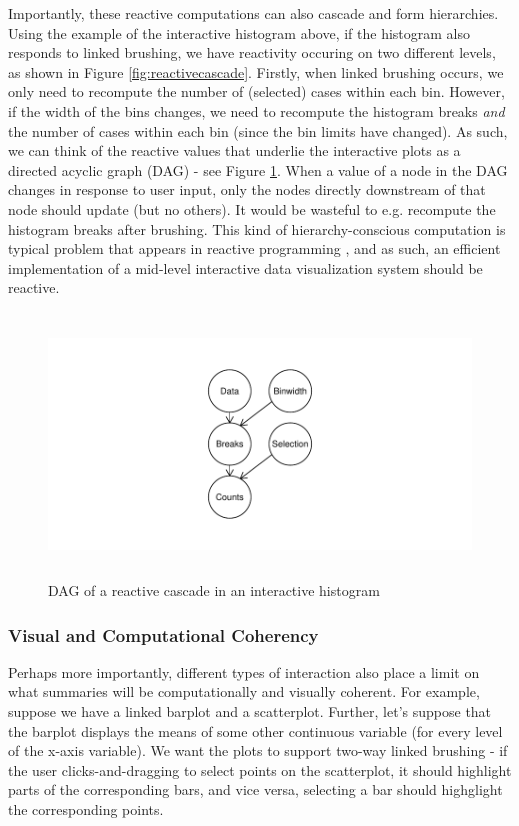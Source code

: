 \documentclass[12pt,a4paper]{article}
\begin{document}
Importantly, these reactive computations can also cascade and form hierarchies. Using the example of the interactive histogram above, if the histogram also responds to linked brushing, we have reactivity occuring on two different levels, as shown in Figure \ref{fig:reactivecascade}. Firstly, when linked brushing occurs, we only need to recompute the number of (selected) cases within each bin. However, if the width of the bins changes, we need to recompute the histogram breaks \textit{and} the number of cases within each bin (since the bin limits have changed). As such, we can think of the reactive values that underlie the interactive plots as a directed acyclic graph (DAG) - see Figure \ref{fig:dag}. When a value of a node in the DAG changes in response to user input, only the nodes directly downstream of that node should update (but no others). It would be wasteful to e.g. recompute the histogram breaks after brushing. This kind of hierarchy-conscious computation is typical problem that appears in reactive programming \citep[see e.g.][]{doglio2016}, and as such, an efficient implementation of a mid-level interactive data visualization system should be reactive.            

\begin{figure}[H]
\centering
\includegraphics[height=70mm]{./figure04.pdf}
\caption{DAG of a reactive cascade in an interactive histogram}
\label{fig:dag}
\end{figure}

\subsubsection{Visual and Computational Coherency}
\label{sec:coherency}

Perhaps more importantly, different types of interaction also place a limit on what summaries will be computationally and visually coherent. For example, suppose we have a linked barplot and a scatterplot. Further, let's suppose that the barplot displays the means of some other continuous variable (for every level of the x-axis variable). We want the plots to support two-way linked brushing - if the user clicks-and-dragging to select points on the scatterplot, it should highlight parts of the corresponding bars, and vice versa, selecting a bar should highglight the corresponding points.
\end{document}
